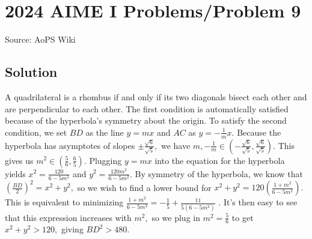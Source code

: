 \documentclass[12pt]{article}
\begin{document}
\section*{{2024 AIME I Problems/Problem 9}}
Source: AoPS Wiki

\subsection*{Solution}
A quadrilateral is a rhombus if and only if its two diagonals bisect each other and are perpendicular to each other. The first condition is automatically satisfied because of the hyperbola's symmetry about the origin. To satisfy the second condition, we set $BD$ as the line $y = mx$ and $AC$ as $y = -\frac{1}{m}x.$ Because the hyperbola has asymptotes of slopes $\pm \frac{\sqrt6}{\sqrt5},$ we have $m, -\frac{1}{m} \in \left(-\frac{\sqrt6}{\sqrt5}, \frac{\sqrt6}{\sqrt5}\right).$ This gives us $m^2 \in \left(\frac{5}{6}, \frac{6}{5}\right).$ Plugging $y = mx$ into the equation for the hyperbola yields $x^2 = \frac{120}{6-5m^2}$ and $y^2 = \frac{120m^2}{6-5m^2}.$ By symmetry of the hyperbola, we know that $\left(\frac{BD}{2}\right)^2 = x^2 + y^2,$ so we wish to find a lower bound for $x^2 + y^2 = 120\left(\frac{1+m^2}{6-5m^2}\right).$ This is equivalent to minimizing $\frac{1+m^2}{6-5m^2} = -\frac{1}{5} + \frac{11}{5(6-5m^2)}$ . It's then easy to see that this expression increases with $m^2,$ so we plug in $m^2 = \frac{5}{6}$ to get $x^2+y^2 > 120,$ giving $BD^2 > \boxed{480}.$
\end{document}
